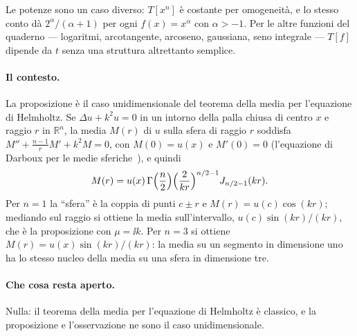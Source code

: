 Le potenze sono un caso diverso: $T[x^n]$ \`e costante per omogeneit\`a, e lo
stesso conto d\`a $2^\alpha/(\alpha+1)$ per ogni $f(x)=x^\alpha$ con
$\alpha>-1$. Per le altre funzioni del quaderno --- logaritmi, arcotangente,
arcoseno, gaussiana, seno integrale --- $T[f]$ dipende da $t$ senza una
struttura altrettanto semplice.

\paragraph{Il contesto.}
La proposizione \`e il caso unidimensionale del teorema della media per
l'equazione di Helmholtz. Se $\Delta u+k^2u=0$ in un intorno della palla
chiusa di centro $x$ e raggio $r$ in $\mathbb{R}^n$, la media $M(r)$ di $u$
sulla sfera di raggio $r$ soddisfa
$M''+\frac{n-1}{r}M'+k^2M=0$, con $M(0)=u(x)$ e $M'(0)=0$ (l'equazione di
Darboux per le medie sferiche~\cite{john1955}), e quindi
\[
  M(r)=u(x)\,\Gamma\Bigl(\frac n2\Bigr)\Bigl(\frac{2}{kr}\Bigr)^{n/2-1}
  J_{n/2-1}(kr).
\]
Per $n=1$ la ``sfera'' \`e la coppia di punti $c\pm r$ e $M(r)=u(c)\cos(kr)$;
mediando sul raggio si ottiene la media sull'intervallo,
$u(c)\sin(kr)/(kr)$, che \`e la proposizione con $\mu=\ii k$. Per $n=3$ si
ottiene $M(r)=u(x)\sin(kr)/(kr)$: la media su un segmento in dimensione uno
ha lo stesso nucleo della media su una sfera in dimensione tre.

\paragraph{Che cosa resta aperto.}
Nulla: il teorema della media per l'equazione di Helmholtz \`e classico, e la
proposizione e l'osservazione ne sono il caso unidimensionale.
